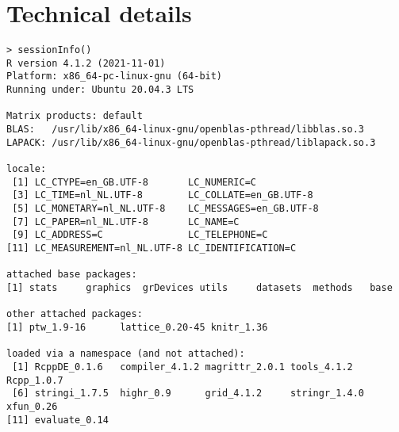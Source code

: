 \documentclass[a4paper,11pt]{article}\usepackage[]{graphicx}\usepackage[]{color}
\makeatletter
\newenvironment{kframe}{%
 \def\at@end@of@kframe{}%
 \ifinner\ifhmode%
  \def\at@end@of@kframe{\end{minipage}}%
  \begin{minipage}{\columnwidth}%
 \fi\fi%
 \def\FrameCommand##1{\hskip\@totalleftmargin \hskip-\fboxsep
 \colorbox{shadecolor}{##1}\hskip-\fboxsep
     \hskip-\linewidth \hskip-\@totalleftmargin \hskip\columnwidth}%
 \MakeFramed {\advance\hsize-\width
   \@totalleftmargin\z@ \linewidth\hsize
   \@setminipage}}%
 {\par\unskip\endMakeFramed%
 \at@end@of@kframe}
\newenvironment{knitrout}{}{} %
\makeatother
\begin{document}
\section{Technical details}
\begin{knitrout}\small
{}\color{fgcolor}\begin{kframe}
\begin{verbatim}
> sessionInfo()
R version 4.1.2 (2021-11-01)
Platform: x86_64-pc-linux-gnu (64-bit)
Running under: Ubuntu 20.04.3 LTS

Matrix products: default
BLAS:   /usr/lib/x86_64-linux-gnu/openblas-pthread/libblas.so.3
LAPACK: /usr/lib/x86_64-linux-gnu/openblas-pthread/liblapack.so.3

locale:
 [1] LC_CTYPE=en_GB.UTF-8       LC_NUMERIC=C              
 [3] LC_TIME=nl_NL.UTF-8        LC_COLLATE=en_GB.UTF-8    
 [5] LC_MONETARY=nl_NL.UTF-8    LC_MESSAGES=en_GB.UTF-8   
 [7] LC_PAPER=nl_NL.UTF-8       LC_NAME=C                 
 [9] LC_ADDRESS=C               LC_TELEPHONE=C            
[11] LC_MEASUREMENT=nl_NL.UTF-8 LC_IDENTIFICATION=C       

attached base packages:
[1] stats     graphics  grDevices utils     datasets  methods   base     

other attached packages:
[1] ptw_1.9-16      lattice_0.20-45 knitr_1.36     

loaded via a namespace (and not attached):
 [1] RcppDE_0.1.6   compiler_4.1.2 magrittr_2.0.1 tools_4.1.2    Rcpp_1.0.7    
 [6] stringi_1.7.5  highr_0.9      grid_4.1.2     stringr_1.4.0  xfun_0.26     
[11] evaluate_0.14 
\end{verbatim}
\end{kframe}
\end{knitrout}
\end{document}

